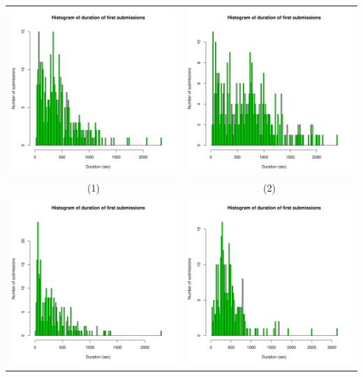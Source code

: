 \documentclass[a4paper]{article}
\theoremstyle{definition}
\begin{document}
\begin{enumerate}[a)]
\begin{itemize}
\begin{center}
\begin{tabular}{c c}
                 \includegraphics[width = 6.9cm]{Images/img12-2-1.png} & \includegraphics[width = 6.9cm]{Images/img12-2-2.png} \\
                 (1) & (2) \\
                 \includegraphics[width = 6.9cm]{Images/img12-2-3.png} &
                 \includegraphics[width = 6.9cm]{Images/img12-2-4.png} \\

\end{tabular}
\end{center}
\end{itemize}
\end{enumerate}
\end{document}
